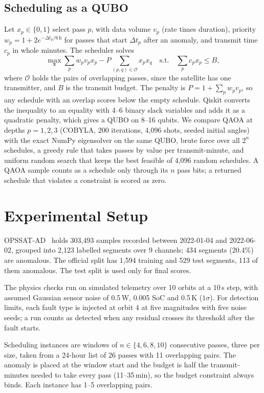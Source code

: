\documentclass[conference]{IEEEtran}
\begin{document}
\subsection{Scheduling as a QUBO}
Let $x_p \in \{0,1\}$ select pass $p$, with data volume $v_p$ (rate times duration), priority
$w_p = 1 + 2e^{-\Delta t_p/6\,\mathrm{h}}$ for passes that start $\Delta t_p$ after an
anomaly, and transmit time $c_p$ in whole minutes. The scheduler solves
\begin{equation}
\max_{\mathbf{x}} \sum_{p} w_p v_p x_p - P\!\!\sum_{(p,q)\in\mathcal{O}}\!\! x_p x_q
\quad \text{s.t.} \quad \sum_{p} c_p x_p \le B,
\label{eq:qubo}
\end{equation}
where $\mathcal{O}$ holds the pairs of overlapping passes, since the satellite has one
transmitter, and $B$ is the transmit budget. The penalty is $P = 1 + \sum_p w_p v_p$, so any
schedule with an overlap scores below the empty schedule. Qiskit converts the inequality to an
equality with 4--6 binary slack variables and adds it as a quadratic penalty, which gives a
QUBO on 8--16 qubits. We compare QAOA at depths $p = 1,2,3$ (COBYLA, 200 iterations,
4,096 shots, seeded initial angles) with the exact NumPy eigensolver on the same QUBO, brute
force over all $2^{n}$ schedules, a greedy rule that takes passes by value per
transmit-minute, and uniform random search that keeps the best feasible of 4,096 random
schedules. A QAOA sample counts as a schedule only through its $n$ pass bits; a returned
schedule that violates a constraint is scored as zero.

\section{Experimental Setup}
OPSSAT-AD~\cite{ruszczak2025} holds 303,493 samples recorded between 2022-01-04 and
2022-06-02, grouped into 2,123 labelled segments over 9 channels; 434 segments (20.4\%) are
anomalous. The official split has 1,594 training and 529 test segments, 113 of them
anomalous. The test split is used only for final scores.

The physics checks run on simulated telemetry over 10 orbits at a 10\,s step, with assumed
Gaussian sensor noise of 0.5\,W, 0.005 SoC and 0.5\,K ($1\sigma$). For detection limits, each
fault type is injected at orbit 4 at five magnitudes with five noise seeds; a run counts as
detected when any residual crosses its threshold after the fault starts.

Scheduling instances are windows of $n \in \{4,6,8,10\}$ consecutive passes, three per size,
taken from a 24-hour list of 26 passes with 11 overlapping pairs. The anomaly is placed at the
window start and the budget is half the transmit-minutes needed to take every pass
(11--35\,min), so the budget constraint always binds. Each instance has 1--5 overlapping pairs.
\end{document}
